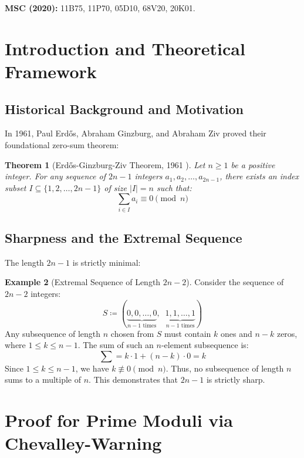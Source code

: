 \documentclass[11pt,a4paper]{article}
\newtheorem{theorem}{Theorem}[section]
\theoremstyle{definition}
\newtheorem{example}[theorem]{Example}
\begin{document}
\noindent\textbf{MSC (2020):} 11B75, 11P70, 05D10, 68V20, 20K01.

\tableofcontents
\newpage

\section{Introduction and Theoretical Framework}

\subsection{Historical Background and Motivation}
In 1961, Paul Erd\H{o}s, Abraham Ginzburg, and Abraham Ziv \cite{egz1961} proved their foundational zero-sum theorem:

\begin{theorem}[Erd\H{o}s-Ginzburg-Ziv Theorem, 1961 \cite{egz1961}]\label{thm:egz_main}
Let $n \ge 1$ be a positive integer.
For any sequence of $2n - 1$ integers $a_1, a_2, \dots, a_{2n - 1}$, there exists an index subset $I \subseteq \{1, 2, \dots, 2n - 1\}$ of size $|I| = n$ such that:
\begin{equation}\label{eq:egz_sum}
\sum_{i \in I} a_i \equiv 0 \pmod n
\end{equation}
\end{theorem}

\subsection{Sharpness and the Extremal Sequence}
The length $2n - 1$ is strictly minimal:

\begin{example}[Extremal Sequence of Length $2n - 2$]\label{ex:egz_sharpness}
Consider the sequence of $2n - 2$ integers:
\[ S \coloneqq (\underbrace{0, 0, \dots, 0}_{n - 1 \text{ times}}, \;\; \underbrace{1, 1, \dots, 1}_{n - 1 \text{ times}}) \]
Any subsequence of length $n$ chosen from $S$ must contain $k$ ones and $n - k$ zeros, where $1 \le k \le n - 1$.
The sum of such an $n$-element subsequence is:
\[ \sum = k \cdot 1 + (n - k) \cdot 0 = k \]
Since $1 \le k \le n - 1$, we have $k \not\equiv 0 \pmod n$.
Thus, no subsequence of length $n$ sums to a multiple of $n$.
This demonstrates that $2n - 1$ is strictly sharp.
\end{example}

\section{Proof for Prime Moduli via Chevalley-Warning}
\end{document}
